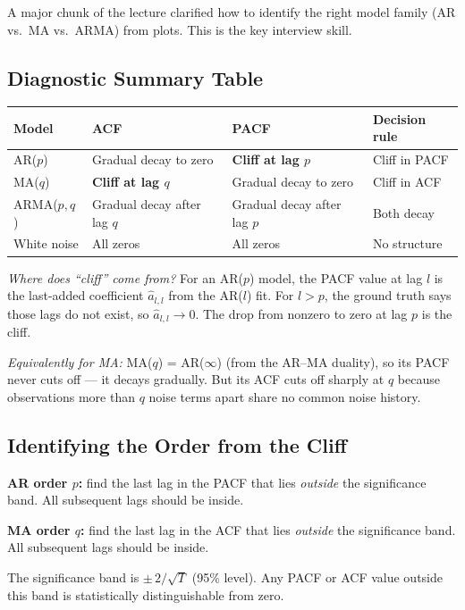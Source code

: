 \documentclass[11pt]{article}
\begin{document}
A major chunk of the lecture clarified how to identify the right model
family (AR vs.\ MA vs.\ ARMA) from plots. This is the key interview skill.

\subsection{Diagnostic Summary Table}

\begin{center}
\begin{tabular}{@{}llll@{}}
\toprule
\textbf{Model} & \textbf{ACF} & \textbf{PACF} & \textbf{Decision rule} \\
\midrule
AR($p$) & Gradual decay to zero & \textbf{Cliff at lag $p$} & Cliff in PACF \\
MA($q$) & \textbf{Cliff at lag $q$} & Gradual decay to zero & Cliff in ACF \\
ARMA($p,q$) & Gradual decay after lag $q$ & Gradual decay after lag $p$ & Both decay \\
White noise & All zeros & All zeros & No structure \\
\bottomrule
\end{tabular}
\end{center}

\textit{Where does ``cliff'' come from?} For an AR($p$) model, the PACF
value at lag $l$ is the last-added coefficient $\hat{a}_{l,l}$ from the
AR($l$) fit. For $l > p$, the ground truth says those lags do not exist,
so $\hat{a}_{l,l} \to 0$. The drop from nonzero to zero at lag $p$ is
the cliff.

\textit{Equivalently for MA:} MA($q$) = AR($\infty$) (from the AR--MA
duality), so its PACF never cuts off --- it decays gradually. But its
ACF cuts off sharply at $q$ because observations more than $q$ noise
terms apart share no common noise history.

\subsection{Identifying the Order from the Cliff}
\textbf{AR order $p$:} find the last lag in the PACF that lies
\emph{outside} the significance band. All subsequent lags should be inside.

\textbf{MA order $q$:} find the last lag in the ACF that lies
\emph{outside} the significance band. All subsequent lags should be inside.

The significance band is $\pm\, 2/\sqrt{T}$ (95\% level). Any PACF or
ACF value outside this band is statistically distinguishable from zero.
\end{document}

